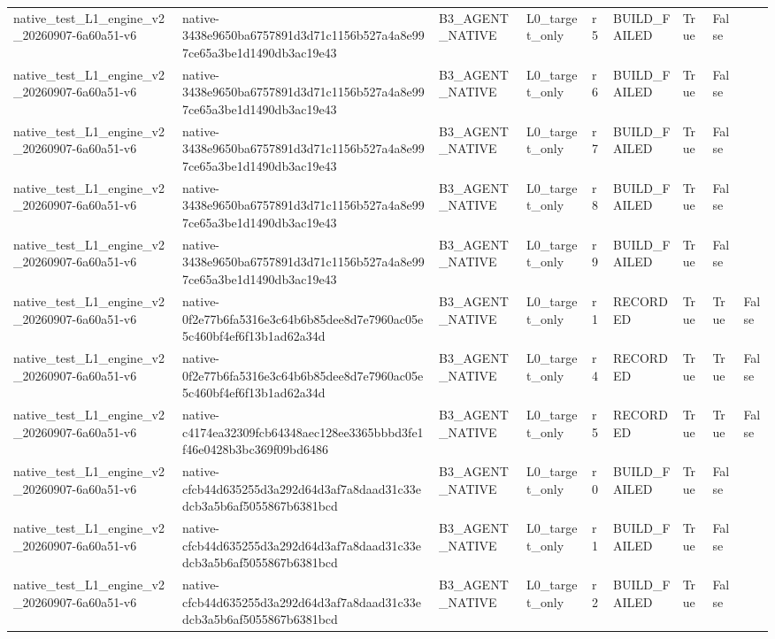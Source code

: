 \begin{tabular}{lllllllll}
native\_test\_L1\_engine\_v2\_20260907-6a60a51-v6 & native-3438e9650ba6757891d3d71c1156b527a4a8e997ce65a3be1d1490db3ac19e43 & B3\_AGENT\_NATIVE & L0\_target\_only & r5 & BUILD\_FAILED & True & False &  \\
native\_test\_L1\_engine\_v2\_20260907-6a60a51-v6 & native-3438e9650ba6757891d3d71c1156b527a4a8e997ce65a3be1d1490db3ac19e43 & B3\_AGENT\_NATIVE & L0\_target\_only & r6 & BUILD\_FAILED & True & False &  \\
native\_test\_L1\_engine\_v2\_20260907-6a60a51-v6 & native-3438e9650ba6757891d3d71c1156b527a4a8e997ce65a3be1d1490db3ac19e43 & B3\_AGENT\_NATIVE & L0\_target\_only & r7 & BUILD\_FAILED & True & False &  \\
native\_test\_L1\_engine\_v2\_20260907-6a60a51-v6 & native-3438e9650ba6757891d3d71c1156b527a4a8e997ce65a3be1d1490db3ac19e43 & B3\_AGENT\_NATIVE & L0\_target\_only & r8 & BUILD\_FAILED & True & False &  \\
native\_test\_L1\_engine\_v2\_20260907-6a60a51-v6 & native-3438e9650ba6757891d3d71c1156b527a4a8e997ce65a3be1d1490db3ac19e43 & B3\_AGENT\_NATIVE & L0\_target\_only & r9 & BUILD\_FAILED & True & False &  \\
native\_test\_L1\_engine\_v2\_20260907-6a60a51-v6 & native-0f2e77b6fa5316e3c64b6b85dee8d7e7960ac05e5c460bf4ef6f13b1ad62a34d & B3\_AGENT\_NATIVE & L0\_target\_only & r1 & RECORDED & True & True & False \\
native\_test\_L1\_engine\_v2\_20260907-6a60a51-v6 & native-0f2e77b6fa5316e3c64b6b85dee8d7e7960ac05e5c460bf4ef6f13b1ad62a34d & B3\_AGENT\_NATIVE & L0\_target\_only & r4 & RECORDED & True & True & False \\
native\_test\_L1\_engine\_v2\_20260907-6a60a51-v6 & native-c4174ea32309fcb64348aec128ee3365bbbd3fe1f46e0428b3bc369f09bd6486 & B3\_AGENT\_NATIVE & L0\_target\_only & r5 & RECORDED & True & True & False \\
native\_test\_L1\_engine\_v2\_20260907-6a60a51-v6 & native-cfcb44d635255d3a292d64d3af7a8daad31c33edcb3a5b6af5055867b6381bcd & B3\_AGENT\_NATIVE & L0\_target\_only & r0 & BUILD\_FAILED & True & False &  \\
native\_test\_L1\_engine\_v2\_20260907-6a60a51-v6 & native-cfcb44d635255d3a292d64d3af7a8daad31c33edcb3a5b6af5055867b6381bcd & B3\_AGENT\_NATIVE & L0\_target\_only & r1 & BUILD\_FAILED & True & False &  \\
native\_test\_L1\_engine\_v2\_20260907-6a60a51-v6 & native-cfcb44d635255d3a292d64d3af7a8daad31c33edcb3a5b6af5055867b6381bcd & B3\_AGENT\_NATIVE & L0\_target\_only & r2 & BUILD\_FAILED & True & False &  \\

\end{tabular}
